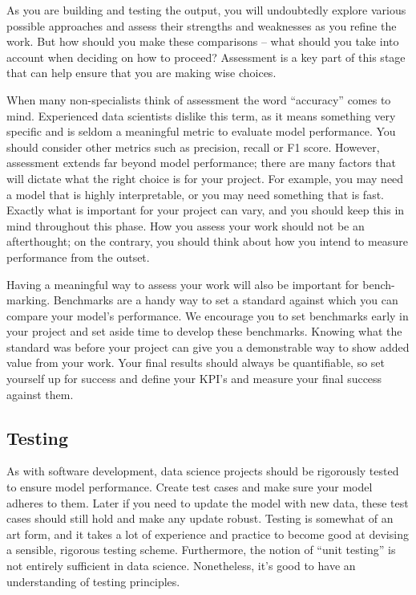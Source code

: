 \documentclass[
]{book}
\begin{document}
As you are building and testing the output, you will undoubtedly explore
various possible approaches and assess their strengths and weaknesses as
you refine the work. But how should you make these comparisons -- what
should you take into account when deciding on how to proceed? Assessment
is a key part of this stage that can help ensure that you are making
wise choices.

When many non-specialists think of assessment the word ``accuracy''
comes to mind. Experienced data scientists dislike this term, as it
means something very specific and is seldom a meaningful metric to
evaluate model performance. You should consider other metrics such as
precision, recall or F1 score. However, assessment extends far beyond
model performance; there are many factors that will dictate what the
right choice is for your project. For example, you may need a model that
is highly interpretable, or you may need something that is fast. Exactly
what is important for your project can vary, and you should keep this in
mind throughout this phase. How you assess your work should not be an
afterthought; on the contrary, you should think about how you intend to
measure performance from the outset.

Having a meaningful way to assess your work will also be important for
bench-marking. Benchmarks are a handy way to set a standard against
which you can compare your model's performance. We encourage you to set
benchmarks early in your project and set aside time to develop these
benchmarks. Knowing what the standard was before your project can give
you a demonstrable way to show added value from your work. Your final
results should always be quantifiable, so set yourself up for success
and define your KPI's and measure your final success against them.

\hypertarget{testing}{%
\subsection{Testing}\label{testing}}

As with software development, data science projects should be rigorously
tested to ensure model performance. Create test cases and make sure your
model adheres to them. Later if you need to update the model with new
data, these test cases should still hold and make any update robust.
Testing is somewhat of an art form, and it takes a lot of experience and
practice to become good at devising a sensible, rigorous testing scheme.
Furthermore, the notion of ``unit testing'' is not entirely sufficient
in data science. Nonetheless, it's good to have an understanding of
testing principles.
\end{document}
